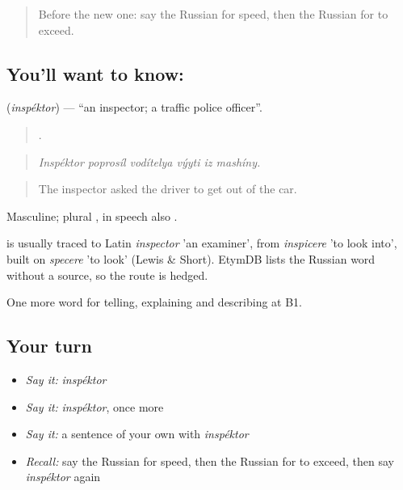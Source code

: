 \label{lesson:RU-C408-inspektor}



\begin{quote}
Before the new one: say the Russian for speed, then the Russian for to exceed.
\end{quote}

\subsection*{You'll want to know: }
\textbf{} (\emph{inspéktor}) — \textquotedblleft{}an inspector; a traffic police officer\textquotedblright{}.

\begin{quote}
     .
\end{quote}

\begin{quote}
\emph{Inspéktor poprosíl vodítelya výyti iz mashíny.}
\end{quote}

\begin{quote}
The inspector asked the driver to get out of the car.
\end{quote}

Masculine; plural \emph{}, in speech also \emph{}.

\begin{cousinweb}
\emph{} is usually traced to Latin \emph{inspector} 'an examiner', from \emph{inspicere} 'to look into', built on \emph{specere} 'to look' (Lewis \& Short). EtymDB lists the Russian word without a source, so the route is hedged.
\end{cousinweb}

\begin{grammarlens}[title={What you've built}]
One more word for telling, explaining and describing at B1.
\end{grammarlens}

\subsection*{Your turn}
\begin{itemize}
\raggedright
  \item \emph{Say it:} \emph{inspéktor}
  \item \emph{Say it:} \emph{inspéktor}, once more
  \item \emph{Say it:} a sentence of your own with \emph{inspéktor}
  \item \emph{Recall:} say the Russian for speed, then the Russian for to exceed, then say \emph{inspéktor} again
\end{itemize}


